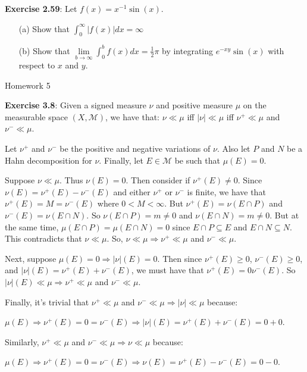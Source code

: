 \documentclass{book}
\newcommand{\hOne}{%
   \color{Black}%
   \fontsize{14}{16}\selectfont%
}
\newcommand{\exTwoP}{%
   \color{RedViolet}%
   \fontsize{13}{15}\selectfont%
}
\newenvironment{myIndent}{%
   \begin{adjustwidth}{2.5em}{0em}%
}{%
   \end{adjustwidth}%
}
\newcommand{\blab}[1]{\textbf{#1}}
\newcommand{\retTwo}{\hfill\bigbreak}
\newcommand{\mHeader}[1]{{
   \color{Black}%
   \fontsize{20}{18}\selectfont%
   #1\retTwo
}}
\begin{document}
\retTwo

\blab{Exercise 2.59}: Let $f(x) = x^{-1}\sin(x)$.

\begin{enumerate}
	\item[(a)] Show that $\int_0^\infty |f(x)|dx = \infty$
	\item[(b)] Show that $\lim\limits_{b \rightarrow \infty} \int_0^b f(x)dx = \frac{1}{2}\pi$ by integrating $e^{-xy}\sin(x)$ with respect to $x$ and $y$. 
\end{enumerate}

\newpage








{\hOne\mHeader{Homework 5}}

\blab{Exercise 3.8}: Given a signed measure $\nu$ and positive measure $\mu$ on the measurable space $(X, \mathcal{M})$, we have that: $\nu \ll \mu$ iff $|\nu| \ll \mu$ iff $\nu^+ \ll \mu$ and $\nu^- \ll \mu$.

\begin{myIndent}\exTwoP
	Let $\nu^+$ and $\nu^-$ be the positive and negative variations of $\nu$. Also let $P$ and $N$ be a Hahn decomposition for $\nu$. Finally, let $E \in \mathcal{M}$ be such that $\mu(E) = 0$.\retTwo

	Suppose $\nu \ll \mu$. Thus $\nu(E) = 0$. Then consider if $\nu^+(E) \neq 0$. Since\\ $\nu(E) = \nu^+(E) - \nu^-(E)$ and either $\nu^+$ or $\nu^-$ is finite, we have that\\ $\nu^+(E) = M = \nu^-(E)$ where $0 < M < \infty$. But $\nu^+(E) = \nu(E \cap P)$ and\\ $\nu^-(E) = \nu(E \cap N)$. So $\nu(E \cap P) = m \neq 0$ and $\nu(E \cap N) = m \neq 0$. But at the same time, $\mu(E \cap P) = \mu(E \cap N) = 0$ since $E \cap P \subseteq E$ and $E \cap N \subseteq N$. This contradicts that $\nu \ll \mu$. So, $\nu \ll \mu \Longrightarrow \nu^+ \ll \mu$ and $\nu^- \ll \mu$.\retTwo

	Next, suppose $\mu(E) = 0 \Longrightarrow |\nu|(E) = 0$. Then since $\nu^+(E) \geq 0$, $\nu^-(E) \geq 0$,\\ and $|\nu|(E) = \nu^+(E) + \nu^-(E)$, we must have that $\nu^+(E) = 0 \nu^-(E)$. So\\ $|\nu|(E) \ll \mu \Longrightarrow \nu^+ \ll \mu$ and $\nu^- \ll \mu$.\retTwo

	Finally, it's trivial that $\nu^+ \ll \mu$ and $\nu^- \ll \mu \Longrightarrow |\nu| \ll \mu$ because:
	
	{\centering $\mu(E) \Longrightarrow \nu^+(E) = 0 = \nu^-(E) \Longrightarrow |\nu|(E) = \nu^+(E) + \nu^-(E) = 0 + 0$.\retTwo\par}

	Similarly, $\nu^+ \ll \mu$ and $\nu^- \ll \mu \Longrightarrow \nu \ll \mu$ because:

	{\centering $\mu(E) \Longrightarrow \nu^+(E) = 0 = \nu^-(E) \Longrightarrow \nu(E) = \nu^+(E) - \nu^-(E) = 0 - 0$.\retTwo\par}
\end{myIndent}
\end{document}
